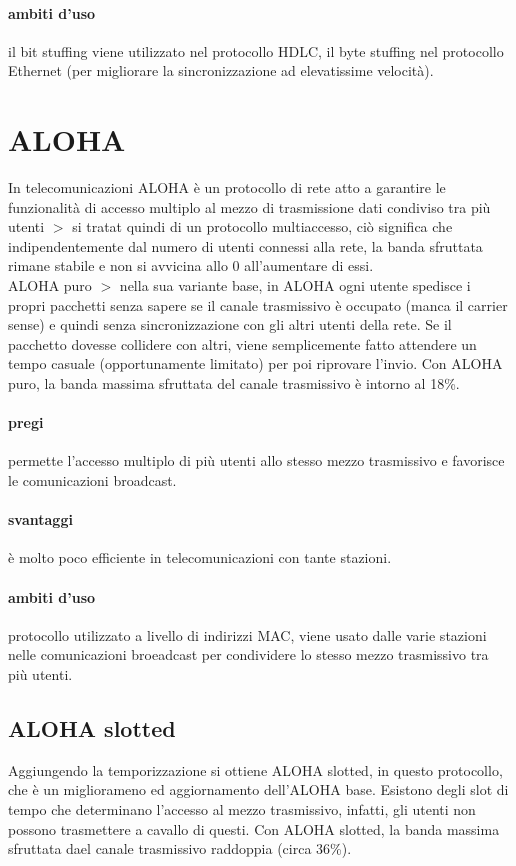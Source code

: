 \documentclass{article}
\begin{document}
\paragraph{ambiti d'uso} il bit stuffing viene utilizzato nel protocollo HDLC,
il byte stuffing nel protocollo Ethernet (per migliorare la sincronizzazione ad
elevatissime velocità).

\section{ALOHA}

In telecomunicazioni ALOHA è un protocollo di rete atto a garantire le
funzionalità di accesso multiplo al mezzo di trasmissione dati condiviso tra più
utenti $>$ si tratat quindi di un protocollo multiaccesso, ciò significa che
indipendentemente dal numero di utenti connessi alla rete, la banda sfruttata
rimane stabile e non si avvicina allo 0 all'aumentare di essi.\\
ALOHA puro $>$ nella sua variante base, in ALOHA ogni utente spedisce i propri
pacchetti senza sapere se il canale trasmissivo è occupato (manca il carrier
sense) e quindi senza sincronizzazione con gli altri utenti della rete. Se il
pacchetto dovesse collidere con altri, viene semplicemente fatto attendere un
tempo casuale (opportunamente limitato) per poi riprovare l'invio. Con ALOHA
puro, la banda massima sfruttata del canale trasmissivo è intorno al 18\%.

\paragraph{pregi} permette l'accesso multiplo di più utenti allo stesso mezzo
trasmissivo e favorisce le comunicazioni broadcast.

\paragraph{svantaggi} è molto poco efficiente in telecomunicazioni con tante
stazioni.

\paragraph{ambiti d'uso} protocollo utilizzato a livello di indirizzi MAC, viene
usato dalle varie stazioni nelle comunicazioni broeadcast per condividere lo
stesso mezzo trasmissivo tra più utenti.

\subsection{ALOHA slotted}
Aggiungendo la temporizzazione si ottiene ALOHA slotted, in questo protocollo,
che è un migliorameno ed aggiornamento dell'ALOHA base. Esistono degli slot di
tempo che determinano l'accesso al mezzo trasmissivo, infatti, gli utenti non
possono trasmettere a cavallo di questi. Con ALOHA slotted, la banda massima
sfruttata dael canale trasmissivo raddoppia (circa 36\%).
\end{document}
